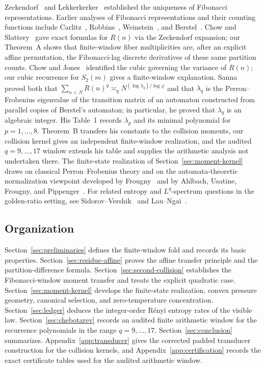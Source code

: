 Zeckendorf~\cite{Zeckendorf1972} and Lekkerkerker~\cite{Lekkerkerker1952}
established the uniqueness of Fibonacci representations.  Earlier analyses of
Fibonacci representations and their counting functions include
Carlitz~\cite{Carlitz1968}, Robbins~\cite{Robbins1996},
Weinstein~\cite{Weinstein2016}, and Berstel~\cite{Berstel2001}.  Chow and
Slattery~\cite{ChowSlattery2021} gave exact formulas for $R(n)$ via the
Zeckendorf expansion; our Theorem~A shows that finite-window fiber
multiplicities are, after an explicit affine permutation, the Fibonacci-lag
discrete derivatives of these same partition counts.  Chow and
Jones~\cite{ChowJones2024} identified the cubic governing the variance of
$R(n)$; our cubic recurrence for $S_2(m)$ gives a finite-window explanation.
Sanna~\cite[Thm.~1]{Sanna2025} proved both that
$\sum_{n<N}R(n)^q\asymp_q N^{(\log\lambda_q)/\log\varphi}$ and that
$\lambda_q$ is the Perron--Frobenius eigenvalue of the transition matrix of an
automaton constructed from parallel copies of Berstel's automaton; in
particular, he proved that $\lambda_q$ is an algebraic integer.  His Table~1
records $\lambda_p$ and its minimal polynomial for $p=1,\dots,8$.
Theorem~B transfers his constants to the collision moments, our collision
kernel gives an independent finite-window realization, and the audited
$q=9,\dots,17$ window extends his table and supplies the arithmetic analysis
not undertaken there.  The finite-state realization of
Section~\ref{sec:moment-kernel} draws on classical Perron--Frobenius theory
\cite{Seneta2006,LindMarcus1995} and on the automata-theoretic normalization
viewpoint developed by Frougny~\cite{Frougny1991FibonacciAutomata,Frougny1992NumbersAutomata}
and by Ahlbach, Usatine, Frougny, and
Pippenger~\cite{AhlbachUsatineFrougnyPippenger2013}.  For related entropy and
\(L^q\)-spectrum questions in the golden-ratio setting, see
Sidorov--Vershik~\cite{SidorovVershik1998} and
Lau--Ngai~\cite{LauNgai1998}.

\subsection{Organization}

Section~\ref{sec:preliminaries} defines the finite-window fold and records
its basic properties.  Section~\ref{sec:residue-affine} proves the affine
transfer principle and the partition-difference formula.
Section~\ref{sec:second-collision} establishes the Fibonacci-window moment
transfer and treats the explicit quadratic case.
Section~\ref{sec:moment-kernel} develops the finite-state realization, convex
pressure geometry, canonical selection, and zero-temperature concentration.
Section~\ref{sec:ledger} deduces the integer-order R\'enyi entropy rates of
the visible law.  Section~\ref{sec:chebotarev} records an audited finite
arithmetic window for the recurrence polynomials in the range
$q=9,\dots,17$.
Section~\ref{sec:conclusion} summarizes.  Appendix~\ref{app:transducer}
gives the corrected padded transducer construction for the collision kernels,
and Appendix~\ref{app:certification} records the exact certificate tables used
for the audited arithmetic window.
